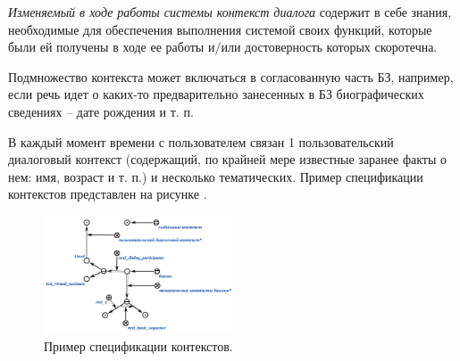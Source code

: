 \textit{Изменяемый в ходе работы системы контекст диалога} содержит в себе знания, необходимые для обеспечения выполнения системой своих функций,  которые были ей получены в ходе ее работы и/или достоверность которых скоротечна.

\begin{SCn}


    \begin{scnindent}
        \begin{scneqtoset}
        \end{scneqtoset}
    \end{scnindent}
    \begin{scnindent}
        \begin{scneqtoset}
        \end{scneqtoset}
    \end{scnindent}

\end{SCn}

Подмножество контекста может включаться в согласованную часть БЗ, например, если речь идет о каких-то предварительно занесенных в БЗ биографических сведениях -- дате рождения и т. п.

В каждый момент времени с пользователем связан 1 пользовательский диалоговый контекст (содержащий, по крайней мере известные заранее факты о нем: имя, возраст и т. п.) и несколько тематических.
Пример спецификации контекстов представлен на рисунке \textit{}.

\begin{figure}[h]
    \centering
    \includegraphics[width=0.5\textwidth]{images/part4/chapter_nl_interfaces/user_context.png}
    \caption{Пример спецификации контекстов.}
    \label{fig:user_context}
\end{figure}

